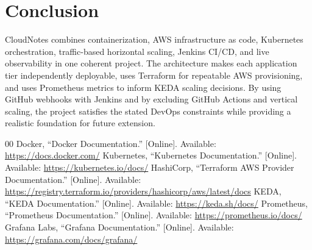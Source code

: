 \documentclass[12pt,a4paper]{article}
\begin{document}
\section{Conclusion}
CloudNotes combines containerization, AWS infrastructure as code, Kubernetes orchestration, traffic-based horizontal scaling, Jenkins CI/CD, and live observability in one coherent project. The architecture makes each application tier independently deployable, uses Terraform for repeatable AWS provisioning, and uses Prometheus metrics to inform KEDA scaling decisions. By using GitHub webhooks with Jenkins and by excluding GitHub Actions and vertical scaling, the project satisfies the stated DevOps constraints while providing a realistic foundation for future extension.

\begin{thebibliography}{00}
 Docker, ``Docker Documentation.'' [Online]. Available: \url{https://docs.docker.com/}
 Kubernetes, ``Kubernetes Documentation.'' [Online]. Available: \url{https://kubernetes.io/docs/}
 HashiCorp, ``Terraform AWS Provider Documentation.'' [Online]. Available: \url{https://registry.terraform.io/providers/hashicorp/aws/latest/docs}
 KEDA, ``KEDA Documentation.'' [Online]. Available: \url{https://keda.sh/docs/}
 Prometheus, ``Prometheus Documentation.'' [Online]. Available: \url{https://prometheus.io/docs/}
 Grafana Labs, ``Grafana Documentation.'' [Online]. Available: \url{https://grafana.com/docs/grafana/}
\end{thebibliography}
\end{document}
